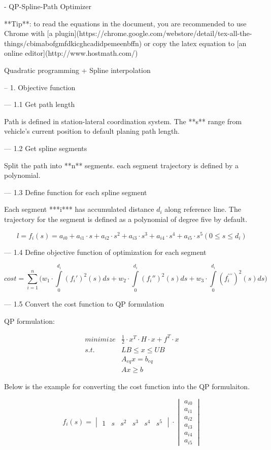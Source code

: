 \documentclass[a4paper,11pt]{article}  %
\begin{document}

- QP-Spline-Path Optimizer

**Tip**: to read the equations in the document, you are recommended to use Chrome with [a plugin](https://chrome.google.com/webstore/detail/tex-all-the-things/cbimabofgmfdkicghcadidpemeenbffn) or copy the latex equation to [an online editor](http://www.hostmath.com/)

Quadratic programming + Spline interpolation

-- 1.  Objective function

--- 1.1  Get path length

Path is defined in station-lateral coordination system. The **s** range from vehicle's current position to  default planing path length.

--- 1.2   Get spline segments

Split the path into **n** segments. each segment trajectory is defined by a polynomial.

--- 1.3  Define function for each spline segment

Each segment ***i*** has accumulated distance $d_i$ along reference line. The trajectory for the segment is defined as a polynomial of degree five by default.


$$
l = f_i(s)
  = a_{i0} + a_{i1} \cdot s + a_{i2} \cdot s^2 + a_{i3} \cdot s^3 + a_{i4} \cdot s^4 + a_{i5} \cdot s^5        (0 \leq s \leq d_{i})
$$


--- 1.4  Define objective function of optimization for each segment


$$
cost = \sum_{i=1}^{n} \Big( w_1 \cdot \int\limits_{0}^{d_i} (f_i')^2(s) ds + w_2 \cdot \int\limits_{0}^{d_i} (f_i'')^2(s) ds + w_3 \cdot \int\limits_{0}^{d_i} (f_i^{\prime\prime\prime})^2(s) ds \Big)
$$


--- 1.5  Convert the cost function to QP formulation

QP formulation:

$$
\begin{aligned}
minimize  & \frac{1}{2}  \cdot x^T \cdot H \cdot x  + f^T \cdot x \\
s.t. \qquad & LB \leq x \leq UB \\
      & A_{eq}x = b_{eq} \\
      & Ax \geq b
\end{aligned}
$$

Below is the example for converting the cost function into the QP formulaiton. 

$$
f_i(s) =
\begin{vmatrix} 1 & s & s^2 & s^3 & s^4 & s^5 \end{vmatrix}
\cdot
\begin{vmatrix} a_{i0} \\ a_{i1} \\ a_{i2} \\ a_{i3} \\ a_{i4} \\ a_{i5} \end{vmatrix}   
$$
\end{document}
